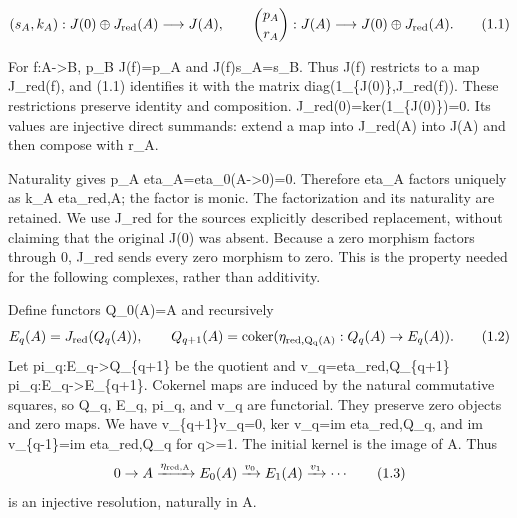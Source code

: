 \[
 (s_A,k_A):J(0)\oplus J_{\rm red}(A)\longrightarrow J(A),
 \qquad
 \binom{p_A}{r_A}:J(A)\longrightarrow J(0)\oplus J_{\rm red}(A).
                                                               \tag{1.1}
\]

For f:\allowbreak{}A\allowbreak{}->B,\allowbreak{} p\_\allowbreak{}B J(f)\allowbreak{}\allowbreak{}=p\_\allowbreak{}A and J(f)\allowbreak{}s\_\allowbreak{}A\allowbreak{}=s\_\allowbreak{}B. Thus J(f)\allowbreak{} restricts to a map J\_\allowbreak{}red(f)\allowbreak{},\allowbreak{} and (1.1)\allowbreak{} identifies it with the matrix diag(1\_\allowbreak{}\{J(0)\allowbreak{}\},\allowbreak{}J\_\allowbreak{}red(f)\allowbreak{})\allowbreak{}. These restrictions preserve identity and composition. J\_\allowbreak{}red(0)\allowbreak{}\allowbreak{}=ker(1\_\allowbreak{}\{J(0)\allowbreak{}\})\allowbreak{}\allowbreak{}=0. Its values are injective direct summands:\allowbreak{} extend a map into J\_\allowbreak{}red(A)\allowbreak{} into J(A)\allowbreak{} and then compose with r\_\allowbreak{}A.

Naturality gives p\_\allowbreak{}A eta\_\allowbreak{}A\allowbreak{}=eta\_\allowbreak{}0(A\allowbreak{}->0)\allowbreak{}\allowbreak{}=0. Therefore eta\_\allowbreak{}A factors uniquely as k\_\allowbreak{}A eta\_\allowbreak{}red,\allowbreak{}A; the factor is monic. The factorization and its naturality are retained. We use J\_\allowbreak{}red for the source\textquotesingle s explicitly described replacement,\allowbreak{} without claiming that the original J(0)\allowbreak{} was absent. Because a zero morphism factors through 0,\allowbreak{} J\_\allowbreak{}red sends every zero morphism to zero. This is the property needed for the following complexes,\allowbreak{} rather than additivity.

Define functors Q\_\allowbreak{}0(A)\allowbreak{}\allowbreak{}=A and recursively \[
 E_q(A)=J_{\rm red}(Q_q(A)),\qquad
 Q_{q+1}(A)=\operatorname{coker}
       (\eta_{\rm red,Q_q(A)}:Q_q(A)\to E_q(A)).
                                                               \tag{1.2}
\] Let pi\_\allowbreak{}q:\allowbreak{}E\_\allowbreak{}q\allowbreak{}->Q\_\allowbreak{}\{q\allowbreak{}+1\} be the quotient and v\_\allowbreak{}q\allowbreak{}=eta\_\allowbreak{}red,\allowbreak{}Q\_\allowbreak{}\{q\allowbreak{}+1\} pi\_\allowbreak{}q:\allowbreak{}E\_\allowbreak{}q\allowbreak{}->E\_\allowbreak{}\{q\allowbreak{}+1\}. Cokernel maps are induced by the natural commutative squares,\allowbreak{} so Q\_\allowbreak{}q,\allowbreak{} E\_\allowbreak{}q,\allowbreak{} pi\_\allowbreak{}q,\allowbreak{} and v\_\allowbreak{}q are functorial. They preserve zero objects and zero maps. We have v\_\allowbreak{}\{q\allowbreak{}+1\}v\_\allowbreak{}q\allowbreak{}=0,\allowbreak{} ker v\_\allowbreak{}q\allowbreak{}=im eta\_\allowbreak{}red,\allowbreak{}Q\_\allowbreak{}q,\allowbreak{} and im v\_\allowbreak{}\{q-1\}\allowbreak{}=im eta\_\allowbreak{}red,\allowbreak{}Q\_\allowbreak{}q for q>\allowbreak{}=1. The initial kernel is the image of A. Thus \[
 0\to A\xrightarrow{\eta_{\rm red,A}}E_0(A)
     \xrightarrow{v_0}E_1(A)\xrightarrow{v_1}\cdots             \tag{1.3}
\] is an injective resolution,\allowbreak{} naturally in A.

